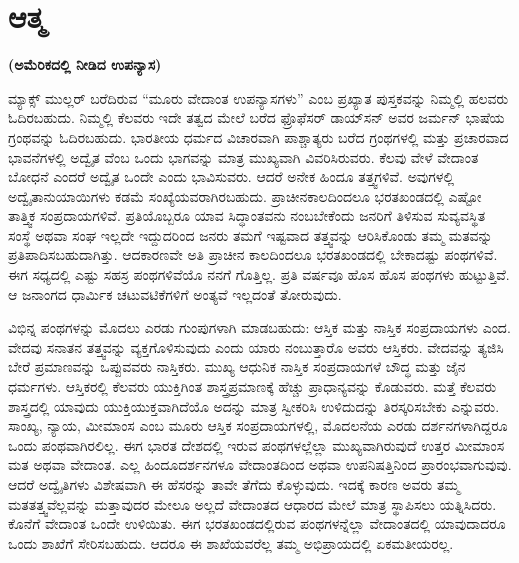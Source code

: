 \chapter{ಆತ್ಮ}

\centerline{\textbf{(ಅಮೆರಿಕದಲ್ಲಿ ನೀಡಿದ ಉಪನ್ಯಾಸ)}}

ಮ್ಯಾಕ್ಸ್​ ಮುಲ್ಲರ್​ ಬರೆದಿರುವ “ಮೂರು ವೇದಾಂತ ಉಪನ್ಯಾಸಗಳು” ಎಂಬ ಪ್ರಖ್ಯಾತ ಪುಸ್ತಕವನ್ನು ನಿಮ್ಮಲ್ಲಿ ಹಲವರು ಓದಿರಬಹುದು. ನಿಮ್ಮಲ್ಲಿ ಕೆಲವರು ಇದೇ ತತ್ವದ ಮೇಲೆ ಬರೆದ ಫ್ರೊಫೆಸರ್​ ಡಾಯ್​ಸನ್​ ಅವರ ಜರ್ಮನ್​ ಭಾಷೆಯ ಗ್ರಂಥವನ್ನು ಓದಿರಬಹುದು. ಭಾರತೀಯ ಧರ್ಮದ ವಿಚಾರವಾಗಿ ಪಾಶ್ಚಾತ್ಯರು ಬರೆದ ಗ್ರಂಥಗಳಲ್ಲಿ ಮತ್ತು ಪ್ರಚಾರವಾದ ಭಾವನೆಗಳಲ್ಲಿ ಅದ್ವೈತ ವೆಂಬ ಒಂದು ಭಾಗವನ್ನು ಮಾತ್ರ ಮುಖ್ಯವಾಗಿ ವಿವರಿಸಿರುವರು. ಕೆಲವು ವೇಳೆ ವೇದಾಂತ ಬೋಧನೆ ಎಂದರೆ ಅದ್ವೈತ ಒಂದೇ ಎಂದು ಭಾವಿಸುವರು. ಆದರೆ ಅನೇಕ ಹಿಂದೂ ತತ್ತ್ವಗಳಿವೆ. ಅವುಗಳಲ್ಲಿ ಅದ್ವೈತಾನುಯಾಯಿಗಳು ಕಡಮೆ ಸಂಖ್ಯೆಯವರಾಗಿರಬಹುದು. ಪ್ರಾಚೀನಕಾಲದಿಂದಲೂ ಭರತಖಂಡದಲ್ಲಿ ಎಷ್ಟೋ ತಾತ್ತ್ವಿಕ ಸಂಪ್ರದಾಯಗಳಿವೆ. ಪ್ರತಿಯೊಬ್ಬರೂ ಯಾವ ಸಿದ್ಧಾಂತವನು ನಂಬಬೇಕೆಂದು ಜನರಿಗೆ ತಿಳಿಸುವ ಸುವ್ಯವಸ್ಥಿತ ಸಂಸ್ಥೆ ಅಥವಾ ಸಂಘ ಇಲ್ಲದೇ ಇದ್ದುದರಿಂದ ಜನರು ತಮಗೆ ಇಷ್ಟವಾದ ತತ್ತ್ವವನ್ನು ಆರಿಸಿಕೊಂಡು ತಮ್ಮ ಮತವನ್ನು ಪ್ರತಿಪಾದಿಸಬಹುದಾಗಿತ್ತು. ಆದಕಾರಣವೇ ಅತಿ ಪ್ರಾಚೀನ ಕಾಲದಿಂದಲೂ ಭರತಖಂಡದಲ್ಲಿ ಬೇಕಾದಷ್ಟು ಪಂಥಗಳಿವೆ. ಈಗ ಸಧ್ಯದಲ್ಲಿ ಎಷ್ಟು ಸಹಸ್ರ ಪಂಥಗಳಿವೆಯೊ ನನಗೆ ಗೊತ್ತಿಲ್ಲ. ಪ್ರತಿ ವರ್ಷವೂ ಹೊಸ ಹೊಸ ಪಂಥಗಳು ಹುಟ್ಟುತ್ತಿವೆ. ಆ ಜನಾಂಗದ ಧಾರ್ಮಿಕ ಚಟುವಟಿಕೆಗಳಿಗೆ ಅಂತ್ಯವೆ ಇಲ್ಲದಂತೆ ತೋರುವುದು.

ವಿಭಿನ್ನ ಪಂಥಗಳನ್ನು ಮೊದಲು ಎರಡು ಗುಂಪುಗಳಾಗಿ ಮಾಡಬಹುದು: ಆಸ್ತಿಕ ಮತ್ತು ನಾಸ್ತಿಕ ಸಂಪ್ರದಾಯಗಳು ಎಂದ. ವೇದವು ಸನಾತನ ತತ್ತ್ವವನ್ನು ವ್ಯಕ್ತಗೊಳಿಸುವುದು ಎಂದು ಯಾರು ನಂಬುತ್ತಾರೊ ಅವರು ಆಸ್ತಿಕರು. ವೇದವನ್ನು ತ್ಯಜಿಸಿ ಬೇರೆ ಪ್ರಮಾಣವನ್ನು ಒಪ್ಪುವವರು ನಾಸ್ತಿಕರು. ಮುಖ್ಯ ಆಧುನಿಕ ನಾಸ್ತಿಕ ಸಂಪ್ರದಾಯಗಳೆ ಬೌದ್ಧ ಮತ್ತು ಜೈನ ಧರ್ಮಗಳು. ಆಸ್ತಿಕರಲ್ಲಿ ಕೆಲವರು ಯುಕ್ತಿಗಿಂತ ಶಾಸ್ತ್ರಪ್ರಮಾಣಕ್ಕೆ ಹೆಚ್ಚು ಪ್ರಾಧಾನ್ಯವನ್ನು ಕೊಡುವರು. ಮತ್ತೆ ಕೆಲವರು ಶಾಸ್ತ್ರದಲ್ಲಿ ಯಾವುದು ಯುಕ್ತಿಯುಕ್ತವಾಗಿದೆಯೊ ಅದನ್ನು ಮಾತ್ರ ಸ್ವೀಕರಿಸಿ ಉಳಿದುದನ್ನು ತಿರಸ್ಕರಿಸಬೇಕು ಎನ್ನುವರು. ಸಾಂಖ್ಯ, ನ್ಯಾಯ, ಮೀಮಾಂಸ ಎಂಬ ಮೂರು ಆಸ್ತಿಕ ಸಂಪ್ರದಾಯಗಳಲ್ಲಿ, ಮೊದಲನೆಯ ಎರಡು ದರ್ಶನಗಳಾಗಿದ್ದರೂ ಒಂದು ಪಂಥವಾಗಿರಲಿಲ್ಲ. ಈಗ ಭಾರತ ದೇಶದಲ್ಲಿ ಇರುವ ಪಂಥಗಳಲ್ಲೆಲ್ಲಾ ಮುಖ್ಯವಾಗಿರುವುದೆ ಉತ್ತರ ಮೀಮಾಂಸ ಮತ ಅಥವಾ ವೇದಾಂತ. ಎಲ್ಲ ಹಿಂದೂದರ್ಶನಗಳೂ ವೇದಾಂತದಿಂದ ಅಥವಾ ಉಪನಿಷತ್ತಿನಿಂದ ಪ್ರಾರಂಭವಾಗುವುವು. ಆದರೆ ಅದ್ವೈತಿಗಳು ವಿಶೇಷವಾಗಿ ಈ ಹೆಸರನ್ನು ತಾವೇ ತೆಗೆದು ಕೊಳ್ಳುವುದು. ಇದಕ್ಕೆ ಕಾರಣ ಅವರು ತಮ್ಮ ಮತತತ್ತ್ವವೆಲ್ಲವನ್ನು ಮತ್ತಾವುದರ ಮೇಲೂ ಅಲ್ಲದೆ ವೇದಾಂತದ ಆಧಾರದ ಮೇಲೆ ಮಾತ್ರ ಸ್ಥಾಪಿಸಲು ಯತ್ನಿಸಿದರು. ಕೊನೆಗೆ ವೇದಾಂತ ಒಂದೇ ಉಳಿಯಿತು. ಈಗ ಭರತಖಂಡದಲ್ಲಿರುವ ಪಂಥಗಳನ್ನೆಲ್ಲಾ ವೇದಾಂತದಲ್ಲಿ ಯಾವುದಾದರೂ ಒಂದು ಶಾಖೆಗೆ ಸೇರಿಸಬಹುದು. ಆದರೂ ಈ ಶಾಖೆಯವರೆಲ್ಲ ತಮ್ಮ ಅಭಿಪ್ರಾಯದಲ್ಲಿ ಏಕಮತೀಯರಲ್ಲ.


